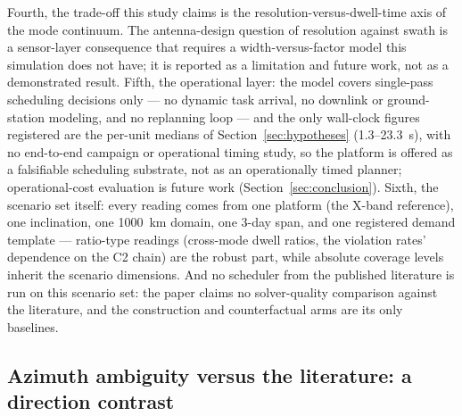 \documentclass[preprint,authoryear]{elsarticle}
\begin{document}
Fourth, the trade-off this study claims is the resolution-versus-dwell-time axis of the mode continuum. The antenna-design question of resolution against swath is a sensor-layer consequence that requires a width-versus-factor model this simulation does not have; it is reported as a limitation and future work, not as a demonstrated result. Fifth, the operational layer: the model covers single-pass scheduling decisions only --- no dynamic task arrival, no downlink or ground-station modeling, and no replanning loop --- and the only wall-clock figures registered are the per-unit medians of Section~\ref{sec:hypotheses} (1.3--23.3~s), with no end-to-end campaign or operational timing study, so the platform is offered as a falsifiable scheduling substrate, not as an operationally timed planner; operational-cost evaluation is future work (Section~\ref{sec:conclusion}). Sixth, the scenario set itself: every reading comes from one platform (the X-band reference), one inclination, one 1000~km domain, one 3-day span, and one registered demand template --- ratio-type readings (cross-mode dwell ratios, the violation rates' dependence on the C2 chain) are the robust part, while absolute coverage levels inherit the scenario dimensions. And no scheduler from the published literature is run on this scenario set: the paper claims no solver-quality comparison against the literature, and the construction and counterfactual arms are its only baselines.

\subsection{Azimuth ambiguity versus the literature: a direction contrast}\label{sec:direction}
\end{document}
